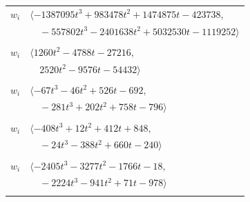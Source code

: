 \documentclass[11pt]{article}
\begin{document}
\begin{longtable}{@{}ll@{}}
$w_i$ & $\langle -1387095t^{3}+983478t^{2}+1474875t-423738,$\\
 & $\quad -557802t^{3}-2401638t^{2}+5032530t-1119252\rangle$\\
\addlinespace[2pt]
\multicolumn{2}{@{}p{0.97\textwidth}@{}}{$i=4$, $D_i=1$, $\rho_{ij}$: $14{:}2, \allowbreak 15{:}1, \allowbreak 16{:}2, \allowbreak 17{:}1, \allowbreak 22{:}1, \allowbreak 30{:}2, \allowbreak 31{:}1, \allowbreak 41{:}1, \allowbreak 42{:}2, \allowbreak 49{:}1, \allowbreak 50{:}2, \allowbreak 51{:}1, \allowbreak 64{:}1, \allowbreak 72{:}1, \allowbreak 73{:}2, \allowbreak 76{:}2, \allowbreak 91{:}2, \allowbreak 97{:}2$}\\
$w_i$ & $\langle 1260t^{2}-4788t-27216,$\\
 & $\quad 2520t^{2}-9576t-54432\rangle$\\
\addlinespace[2pt]
\multicolumn{2}{@{}p{0.97\textwidth}@{}}{$i=5$, $D_i=2$, $\rho_{ij}$: $9{:}2, \allowbreak 10{:}1, \allowbreak 11{:}1, \allowbreak 23{:}1, \allowbreak 26{:}1, \allowbreak 27{:}2, \allowbreak 43{:}1, \allowbreak 52{:}2, \allowbreak 53{:}1, \allowbreak 54{:}2, \allowbreak 63{:}2, \allowbreak 68{:}1, \allowbreak 69{:}2, \allowbreak 77{:}2, \allowbreak 85{:}2, \allowbreak 92{:}1$}\\
$w_i$ & $\langle -67t^{3}-46t^{2}+526t-692,$\\
 & $\quad -281t^{3}+202t^{2}+758t-796\rangle$\\
\addlinespace[2pt]
\multicolumn{2}{@{}p{0.97\textwidth}@{}}{$i=6$, $D_i=1$, $\rho_{ij}$: $0{:}1, \allowbreak 3{:}2, \allowbreak 7{:}2, \allowbreak 15{:}1, \allowbreak 17{:}1, \allowbreak 19{:}1, \allowbreak 20{:}1, \allowbreak 40{:}2, \allowbreak 44{:}1, \allowbreak 46{:}1, \allowbreak 48{:}2, \allowbreak 51{:}2, \allowbreak 53{:}1, \allowbreak 55{:}1, \allowbreak 57{:}1, \allowbreak 58{:}2, \allowbreak 59{:}1, \allowbreak 62{:}1$}\\
$w_i$ & $\langle -408t^{3}+12t^{2}+412t+848,$\\
 & $\quad -24t^{3}-388t^{2}+660t-240\rangle$\\
\addlinespace[2pt]
\multicolumn{2}{@{}p{0.97\textwidth}@{}}{$i=7$, $D_i=1$, $\rho_{ij}$: $6{:}1, \allowbreak 8{:}1, \allowbreak 16{:}2, \allowbreak 19{:}2, \allowbreak 30{:}2, \allowbreak 41{:}2, \allowbreak 43{:}1, \allowbreak 50{:}1, \allowbreak 54{:}2$}\\
$w_i$ & $\langle -2405t^{3}-3277t^{2}-1766t-18,$\\
 & $\quad -2224t^{3}-941t^{2}+71t-978\rangle$\\
\addlinespace[2pt]

\end{longtable}
\end{document}
